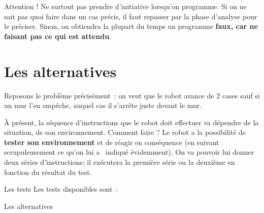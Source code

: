 	Attention ! Ne surtout pas prendre d'initiative
	lorsqu'on programme. Si on ne sait pas quoi faire dans
	un cas précis, il faut repasser par la phase d'analyse
	pour le préciser. Sinon, on obtiendra la plupart du temps un programme
	\textbf{faux, car ne faisant pas ce qui est attendu}.

\section{Les alternatives }

	Reposons le problème précisément~: on veut que le robot avance de 2
	cases sauf si un mur l'en empêche, auquel cas il
	s'arrête juste devant le mur.
	
	À présent, la séquence d'instructions que le robot doit
	effectuer va dépendre de la situation, de son environnement. Comment
	faire ? Le robot a la possibilité de \textbf{tester son environnement}
	et de réagir en conséquence (en suivant scrupuleusement ce
	qu'on lui a \ indiqué évidemment). On va pouvoir lui
	donner deux séries d'instructions; il exécutera la
	première série ou la deuxième en fonction du résultat du test.

	
	\begin{Emphase}[definition]{Les tests}
	Les tests disponibles sont~:
	
	\end{Emphase}

	
	\begin{Emphase}[definition]{Les alternatives}
	\end{Emphase}

